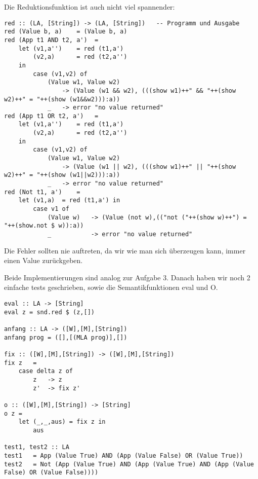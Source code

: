 \documentclass[11pt,a4paper,ngerman]{article}
\begin{document}
\begin{enumerate}[a)]
            Die Reduktionsfunktion ist auch nicht viel spannender:
            \begin{lstlisting}
red :: (LA, [String]) -> (LA, [String])   -- Programm und Ausgabe
red (Value b, a)    = (Value b, a)
red (App t1 AND t2, a')  =
    let (v1,a'')    = red (t1,a')
        (v2,a)      = red (t2,a'')
    in
        case (v1,v2) of
            (Value w1, Value w2)    
                -> (Value (w1 && w2), (((show w1)++" && "++(show w2)++" = "++(show (w1&&w2))):a))
            _   -> error "no value returned"
red (App t1 OR t2, a')   =
    let (v1,a'')    = red (t1,a')
        (v2,a)      = red (t2,a'')
    in
        case (v1,v2) of
            (Value w1, Value w2)
                -> (Value (w1 || w2), (((show w1)++" || "++(show w2)++" = "++(show (w1||w2))):a))
            _   -> error "no value returned"
red (Not t1, a')    =
    let (v1,a)  = red (t1,a') in
        case v1 of
            (Value w)   -> (Value (not w),(("not ("++(show w)++") = "++(show.not $ w)):a))
            _           -> error "no value returned"
            \end{lstlisting}
            Die Fehler sollten nie auftreten, da wir wie man sich überzeugen kann, immer einen
            Value zurückgeben.\\
    
            \pagebreak
    
            Beide Implementierungen sind analog zur Aufgabe 3. Danach haben wir noch 2 einfache
            tests geschrieben, sowie die Semantikfunktionen eval und O.

            \begin{lstlisting}
eval :: LA -> [String]
eval z = snd.red $ (z,[])

anfang :: LA -> ([W],[M],[String])
anfang prog = ([],[(MLA prog)],[])

fix :: ([W],[M],[String]) -> ([W],[M],[String])
fix z   =
    case delta z of
        z   -> z
        z'  -> fix z'

o :: ([W],[M],[String]) -> [String]
o z = 
    let (_,_,aus) = fix z in
        aus

test1, test2 :: LA
test1   = App (Value True) AND (App (Value False) OR (Value True))
test2   = Not (App (Value True) AND (App (Value True) AND (App (Value False) OR (Value False))))
            \end{lstlisting}


\end{enumerate}
\end{document}
